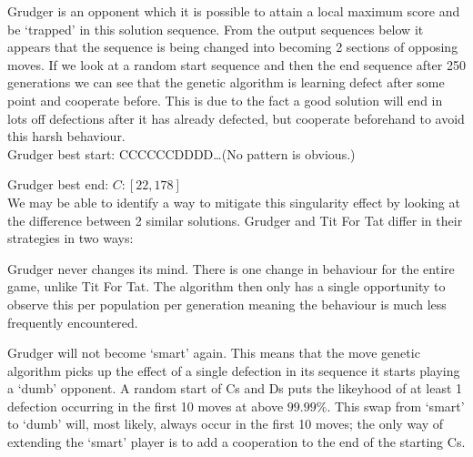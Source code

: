 Grudger is an opponent which it is possible to attain a local maximum score and be `trapped' in this solution sequence.
From the output sequences below it appears that the sequence is being changed into becoming 2 sections of opposing moves.
If we look at a random start sequence and then the end sequence after 250 generations we can see that the genetic algorithm is learning defect after some point and cooperate before.
This is due to the fact a good solution will end in lots off defections after it has already defected, but cooperate beforehand to avoid this harsh behaviour.\\

Grudger best start: CCCCCCDDDD\ldots (No pattern is obvious.)

Grudger best end: \(C:[22,178]\)\\

We may be able to identify a way to mitigate this singularity effect by looking at the difference between 2 similar solutions.
Grudger and Tit For Tat differ in their strategies in two ways:

\begin{itemize}
    \begin{item}
        Grudger never changes its mind.
        There is one change in behaviour for the entire game, unlike Tit For Tat.
        The algorithm then only has a single opportunity to observe this per population per generation meaning the behaviour is much less frequently encountered.
    \end{item}
    \begin{item}
        Grudger will not become `smart' again.
        This means that the move genetic algorithm picks up the effect of a single defection in its sequence it starts playing a `dumb' opponent.
        A random start of Cs and Ds puts the likeyhood of at least 1 defection occurring in the first 10 moves at above \(99.99\% \).
        This swap from `smart' to `dumb' will, most likely, always occur in the first 10 moves;
        the only way of extending the `smart' player is to add a cooperation to the end of the starting Cs.
    \end{item}
\end{itemize}

